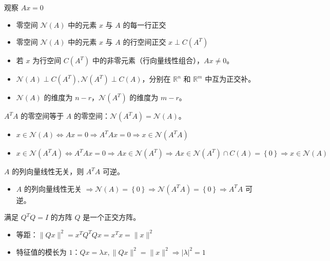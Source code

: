 \begin{remark}
    观察 $Ax = 0$
    \begin{itemize}
        \item 零空间 $\mathcal{N}(A)$ 中的元素 $x$ 与 $A$ 的每一行正交
        \item 零空间 $\mathcal{N}(A)$ 中的元素 $x$ 与 $A$ 的行空间正交 $x \perp C(A^T)$
        \item 若 $x$ 为行空间 $C(A^T)$ 中的非零元素（行向量线性组合），$Ax \neq 0$。
        \item $\mathcal{N}(A) \perp C(A^T), \mathcal{N}(A^T) \perp C(A)$，分别在 $\mathbb{R}^n$ 和 $\mathbb{R}^m$ 中互为正交补。
        \item $\mathcal{N}(A)$ 的维度为 $n - r$，$\mathcal{N}(A^T)$ 的维度为 $m - r$。
    \end{itemize}
\end{remark}

\begin{remark}
	$A^TA$ 的零空间等于 $A$ 的零空间：$\mathcal{N}(A^TA) = \mathcal{N}(A)$。
	\begin{itemize}
		\item $x\in\mathcal{N}(A) \Leftrightarrow Ax=0 \Rightarrow A^TAx=0 \Rightarrow x \in \mathcal{N}(A^TA)$
		\item $x \in \mathcal{N}(A^TA)\Leftrightarrow A^TAx = 0 \Rightarrow Ax \in \mathcal{N}(A^T) \Rightarrow Ax \in \mathcal{N}(A^T)\cap C(A)=\left\{0\right\} \Rightarrow x\in \mathcal{N}(A)$
	\end{itemize}
\end{remark}

\begin{remark}
	$A$ 的列向量线性无关，则 $A^TA$ 可逆。
	\begin{itemize}
		\item $A$ 的列向量线性无关 $\Rightarrow \mathcal{N}(A) = \left\{0\right\}\Rightarrow \mathcal{N}(A^TA) = \left\{0\right\}\Rightarrow A^TA$ 可逆。
	\end{itemize}
\end{remark}

\begin{remark}
    满足 $Q^TQ = I$ 的方阵 $Q$ 是一个正交方阵。
    \begin{itemize}
        \item 等距：$\|Qx\|^2 = x^TQ^TQx = x^Tx = \|x\|^2$
        \item 特征值的模长为 $1$：$Qx = \lambda x, \|Qx\|^2 = \|x\|^2\Rightarrow |\lambda|^2 = 1$
    \end{itemize}
\end{remark}

